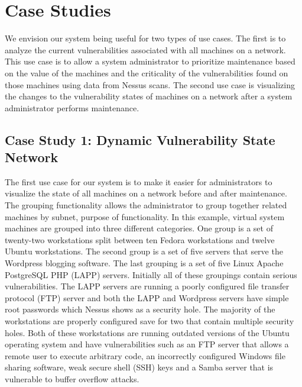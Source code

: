 \documentclass{acm_proc_article-sp}
\begin{document}

\section{Case Studies}
We envision our system being useful for two types of use cases. The first is to
analyze the current vulnerabilities associated with all machines on a network.
This use case is to allow a system administrator to prioritize maintenance based
on the value of the machines and the criticality of the vulnerabilities found on
those machines using data from Nessus scans. The second use case is visualizing 
the changes to the vulnerability states of machines on a network after a system
administrator performs maintenance.



\subsection{Case Study 1: Dynamic Vulnerability State Network }
The first use case for our system is to make it easier for administrators to
visualize the state of all machines on a network before and after maintenance. 
The grouping functionality allows
the administrator to group together related machines by subnet, purpose of
functionality. In this example, virtual system machines are grouped into three
different categories. One group is a set of twenty-two workstations split
between ten Fedora workstations and twelve Ubuntu workstations. The second group is
a set of five servers that serve the Wordpress blogging software.  The last
grouping is a set of five Linux Apache PostgreSQL PHP (LAPP) servers.
Initially all of these groupings contain serious vulnerabilities.
The LAPP servers are running a poorly configured file transfer protocol (FTP) server
and both the LAPP and Wordpress servers have simple root passwords
which Nessus shows as a security hole. The majority of the workstations are properly configured
save for two that contain multiple security holes. Both of these workstations are
running outdated versions of the Ubuntu operating system and have
vulnerabilities such as an FTP server that allows a remote user to execute
arbitrary code, an incorrectly configured Windows file sharing software, weak secure shell
(SSH) keys and a Samba server that is vulnerable to buffer overflow attacks.
\end{document}
